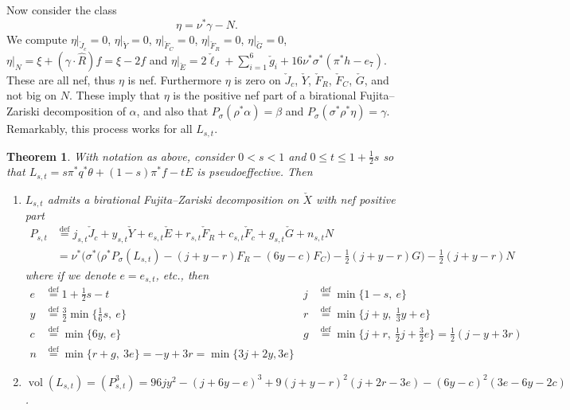 \documentclass[12pt]{amsart}
\newtheorem{theorem}[lemma]{Theorem}
\theoremstyle{definition}
\renewcommand{\leq}{\leqslant}
\DeclareMathOperator{\vol}{vol}
\newcommand{\deq}{\ensuremath{\stackrel{\textrm{def}}{=}}}
\newcommand{\?}{ \circled{{\large\bf ?}}}
\begin{document}
Now consider the class 
\[\eta=\nu^*\gamma-N.\]
We compute $\eta|_{\check J_c}=0$, $\eta|_{\check Y}=0$, $\eta|_{\check F_C}=0$, $\eta|_{\check F_R}=0$, $\eta|_{\check G}=0$, $\eta|_N=\xi+(\gamma\cdot \widehat R)f=\xi-2f$ and $\eta|_{\check E}=2\check{\ell}_J+\sum_{i=1}^6\check g_i+16\nu^*\sigma^*(\pi^*h-e_7)$. These are all nef, thus $\eta$ is nef. Furthermore $\eta$ is zero on $\check J_c$, $\check Y$, $\check F_R$, $\check F_C$, $\check G$, and not big on $N$. These imply that $\eta$ is the positive nef part of a birational Fujita--Zariski decomposition of $\alpha$, and also that $P_{\sigma}(\rho^*\alpha)=\beta$ and $P_{\sigma}(\sigma^*\rho^*\eta)=\gamma$. Remarkably, this process works for all $L_{s,t}$.

\begin{theorem}\label{thm:JxCfinalform}
	With notation as above, consider $0<s<1$ and $0\leq t\leq 1+\frac 12s$ so that $L_{s,t}=s\pi^*q^*\theta+(1-s)\pi^*f-tE$ is pseudoeffective. Then 
\begin{enumerate}
	\item $L_{s,t}$ admits a birational Fujita--Zariski decomposition on $\check X$ with nef positive part
	\begin{align*}
		P_{s,t}&\deq j_{s,t}\check J_c+y_{s,t}\check Y+e_{s,t}\check E+r_{s,t}\check F_R+c_{s,t}\check F_c+g_{s,t}\check G+n_{s,t}N\\
		& = \nu^*\biggl(\sigma^*\biggl(\rho^*P_{\sigma}(L_{s,t})-(j+y-r)F_R-(6y-c)F_C\biggr)-\frac12(j+y-r)G\biggr)-\frac 12(j+y-r)N
	\end{align*}
	where if we denote $e=e_{s,t}$, etc., then
	\begin{align*}
		e&\deq 1+\frac 12s-t & 	j&\deq \min\{1-s,\ e\}\\ 	 
		y&\deq \frac 32\min\{\frac 16s,\ e\} & 
		r&\deq\min\{j+y,\ \frac 13y+e\}\\
		c&\deq\min\{6y,\ e\} &
		g&\deq\min\{j+r,\ \frac 12j+\frac 32e\}=\frac 12(j-y+3r)\\
		n&\deq\min\{r+g,\ 3e\}=-y+3r=\min\{3j+2y,3e\}
	\end{align*}
\smallskip

\item $\vol(L_{s,t})=(P_{s,t}^3)=96jy^2-(j+6y-e)^3+9(j+y-r)^2(j+2r-3e)-(6y-c)^2(3e-6y-2c)$.
\smallskip


\end{enumerate}
\end{theorem}
\end{document}
